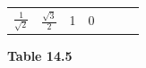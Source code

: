 {{\begin{center}
\begin{xtabular}[t]{|l|l|l|l|l|l|l|}
                  \begin{math}\frac{1}{\sqrt{2}}\end{math}
                 &
    
    
        
                  \begin{math}\frac{\sqrt{3}}{2}\end{math}
                 &
    
    
        1 &
    
    
        0%
     \tabularnewline{}
    \end{xtabular}
      \end{center}
    \begin{center}{\small\bfseries Table 14.5}\end{center}
    
    \addtocounter{footnote}{-0}
    
          } %
        }{%
        }
